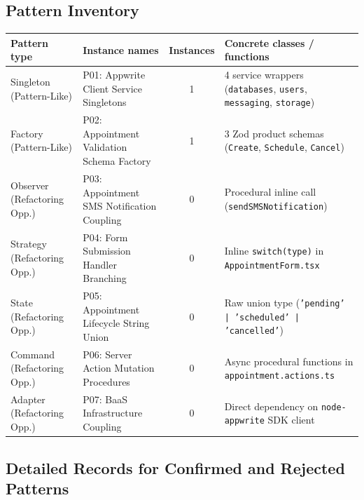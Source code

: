\documentclass[11pt,a4paper]{article}
\begin{document}
\subsection{Pattern Inventory}

\begin{tabularx}{\linewidth}{@{}p{38mm}p{45mm}cp{60mm}@{}}\toprule
Pattern type & Instance names & Instances & Concrete classes / functions\\\midrule
Singleton (Pattern-Like) & P01: Appwrite Client Service Singletons & 1 & 4 service wrappers (\texttt{databases}, \texttt{users}, \texttt{messaging}, \texttt{storage})\\
Factory (Pattern-Like) & P02: Appointment Validation Schema Factory & 1 & 3 Zod product schemas (\texttt{Create}, \texttt{Schedule}, \texttt{Cancel})\\
Observer (Refactoring Opp.) & P03: Appointment SMS Notification Coupling & 0 & Procedural inline call (\texttt{sendSMSNotification})\\
Strategy (Refactoring Opp.) & P04: Form Submission Handler Branching & 0 & Inline \texttt{switch(type)} in \texttt{AppointmentForm.tsx}\\
State (Refactoring Opp.) & P05: Appointment Lifecycle String Union & 0 & Raw union type (\texttt{'pending' | 'scheduled' | 'cancelled'})\\
Command (Refactoring Opp.) & P06: Server Action Mutation Procedures & 0 & Async procedural functions in \texttt{appointment.actions.ts}\\
Adapter (Refactoring Opp.) & P07: BaaS Infrastructure Coupling & 0 & Direct dependency on \texttt{node-appwrite} SDK client\\\bottomrule
\end{tabularx}

\subsection{Detailed Records for Confirmed and Rejected Patterns}
\end{document}
